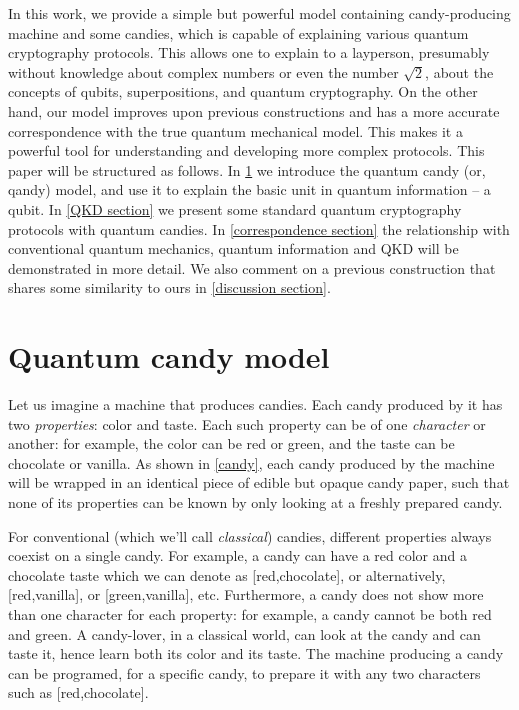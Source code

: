\documentclass{article}
\begin{document}
In this work, we provide a simple but powerful model containing candy-producing machine and some candies, which is capable of explaining various quantum cryptography protocols.
This allows one to explain to a layperson, presumably without knowledge about complex numbers or even the number $\sqrt{2}$, about the concepts of qubits, superpositions, and quantum cryptography.
On the other hand, our model improves upon previous constructions and has a more accurate correspondence with the true quantum mechanical model.
This makes it a powerful tool for understanding and developing more complex protocols.
This paper will be structured as follows.
In \cref{candy section} we introduce the quantum candy (or, qandy) model, and use it to explain the basic unit in quantum information -- a qubit.
In \cref{QKD section} we present some standard quantum cryptography protocols with quantum candies. 
In \cref{correspondence section} the relationship with conventional quantum mechanics, quantum information and QKD will be demonstrated in more detail.
We also comment on a previous construction that shares some similarity to ours in \cref{discussion section}.


\section{Quantum candy model}\label{candy section}
Let us imagine a machine that produces candies.
Each candy produced by it has two \textit{properties}: color and taste.
Each such property can be of one \textit{character} or another: for example, the color can be red or green, and the taste can be chocolate or vanilla.
As shown in \cref{candy}, each candy produced by the machine will be wrapped in an identical piece of edible but opaque candy paper, such that none of its properties can be known by only looking at a freshly prepared candy.

For conventional (which we'll call \textit{classical}) candies, different properties always coexist on a single candy.
For example, a candy can have a red color and a chocolate taste which we can denote as [red,chocolate], or alternatively, [red,vanilla], or [green,vanilla], etc.
Furthermore, a candy does not show more than one character for each property: for example, a candy cannot be both red and green.
A candy-lover, in a classical world, can look at the candy and can taste it, hence learn both its color and its taste.
The machine producing a candy can be programed, for a specific candy, to prepare it with any two characters such as [red,chocolate].
\end{document}
